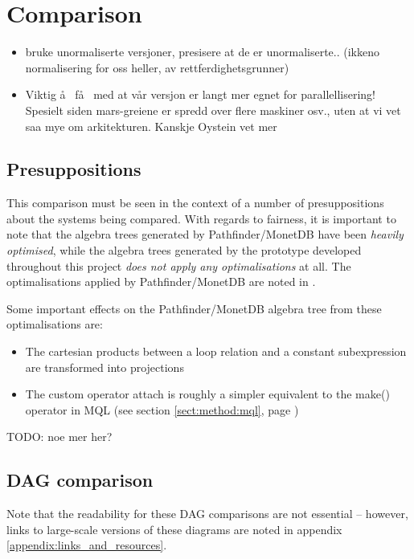 \section{Comparison}
\label{sect:results:comparison}
\begin{itemize}
  \item bruke unormaliserte versjoner, presisere at de er unormaliserte.. (ikkeno normalisering for oss heller, av
  rettferdighetsgrunner)
  \item Viktig \aa~ f\aa~ med at v\aa r versjon er langt mer egnet for
  parallellisering! Spesielt siden mars-greiene er spredd over flere maskiner
  osv., uten at vi vet saa mye om arkitekturen. Kanskje Oystein vet mer
\end{itemize}


\subsection{Presuppositions}
This comparison must be seen in the context of a number of presuppositions
about the systems being compared. With regards to fairness, it is important to
note that the algebra trees generated by Pathfinder/MonetDB have been \emph{heavily
optimised}, while the algebra trees generated by the prototype developed
throughout this project \emph{does not apply any optimalisations} at all. The
optimalisations applied by Pathfinder/MonetDB are noted
in \cite{pathfinder_purelyRelational}.

Some important effects on the Pathfinder/MonetDB algebra tree from these
optimalisations are:
\begin{itemize}
  \item The cartesian products between a loop relation and a constant
  subexpression are transformed into projections
  \item The custom operator \textsf{attach} is roughly a simpler equivalent to
  the \textsf{make()} operator in MQL (see section \ref{sect:method:mql}, page
  \pageref{sect:method:mql})
\end{itemize}
TODO: noe mer her?

\newpage
\subsection{DAG comparison}
Note that the readability for these DAG comparisons are not essential --
however, links to large-scale versions of these diagrams are noted in appendix
\ref{appendix:links_and_resources}.

